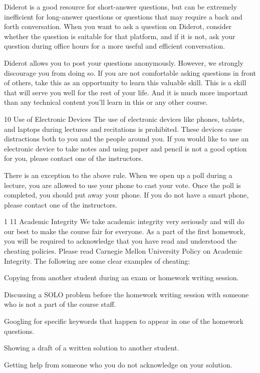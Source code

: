 Diderot is a good resource for short-answer questions, but can be extremely inefficient for long-answer questions or questions that may require a back and forth conversation. When you want to ask a question on Diderot, consider whether the question is suitable for that platform, and if it is not, ask your question during office hours for a more useful and efficient conversation.

Diderot allows you to post your questions anonymously. However, we strongly discourage you from doing so. If you are not comfortable asking questions in front of others, take this as an opportunity to learn this valuable skill. This is a skill that will serve you well for the rest of your life. And it is much more important than any technical content you’ll learn in this or any other course.

 
10  Use of Electronic Devices
The use of electronic devices like phones, tablets, and laptops during lectures and recitations is prohibited. These devices cause distractions both to you and the people around you. If you would like to use an electronic device to take notes and using paper and pencil is not a good option for you, please contact one of the instructors.

There is an exception to the above rule. When we open up a poll during a lecture, you are allowed to use your phone to cast your vote. Once the poll is completed, you should put away your phone. If you do not have a smart phone, please contact one of the instructors.

 1 
11  Academic Integrity
We take academic integrity very seriously and will do our best to make the course fair for everyone. As a part of the first homework, you will be required to acknowledge that you have read and understood the cheating policies. Please read Carnegie Mellon University Policy on Academic Integrity. The following are some clear examples of cheating:

Copying from another student during an exam or homework writing session.

Discussing a SOLO problem before the homework writing session with someone who is not a part of the course staff.

Googling for specific keywords that happen to appear in one of the homework questions.

Showing a draft of a written solution to another student.

Getting help from someone who you do not acknowledge on your solution.

